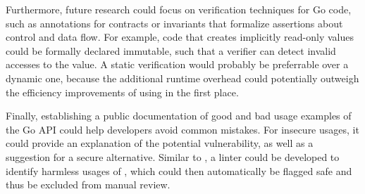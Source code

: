 Furthermore, future research could focus on verification techniques for \unsafe{} Go code, such as annotations for
contracts or invariants that formalize assertions about control and data flow.
For example, \unsafe{} code that creates implicitly read-only values could be formally declared immutable, such that
a verifier can detect invalid accesses to the value.
A static verification would probably be preferrable over a dynamic one, because the additional runtime overhead could
potentially outweigh the efficiency improvements of using \unsafe{} in the first place.

Finally, establishing a public documentation of good and bad usage examples of the Go \unsafe{} \acrshort{API} could
help developers avoid common mistakes.
For insecure usages, it could provide an explanation of the potential vulnerability, as well as a suggestion for a
secure alternative.
Similar to \toolSafer{}, a linter could be developed to identify harmless usages of \unsafe{}, which could then
automatically be flagged safe and thus be excluded from manual review.
